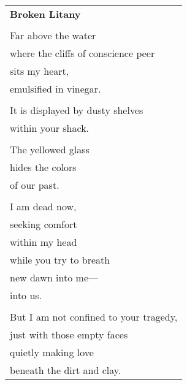\documentclass{article}
\begin{document}
\begin{center}
\begin{tabular}{l}
\textbf{Broken Litany} \\
\\
Far above the water \\
where the cliffs of conscience peer \\
sits my heart, \\
emulsified in vinegar. \\
\\
It is displayed by dusty shelves \\
within your shack. \\
\\
The yellowed glass \\
hides the colors \\
of our past. \\
\\
I am dead now, \\
seeking comfort \\
within my head \\
while you try to breath \\
new dawn into me---\\
into us. \\
\\
But I am not confined to your tragedy, \\
just with those empty faces \\
quietly making love \\
beneath the dirt and clay. \\
\end{tabular}
\end{center}
\end{document}
